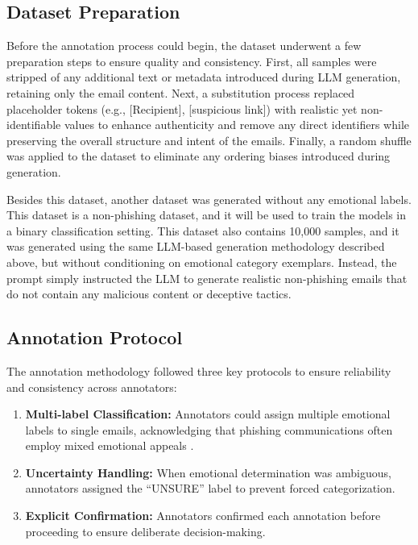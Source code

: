 \subsection{Dataset Preparation}

Before the annotation process could begin, the dataset underwent a few preparation steps to ensure quality and consistency. First, all samples were stripped of any additional text or metadata introduced during LLM generation, retaining only the email content. Next, a substitution process replaced placeholder tokens (e.g., [Recipient], [suspicious link]) with realistic yet non-identifiable values to enhance authenticity and remove any direct identifiers while preserving the overall structure and intent of the emails. Finally, a random shuffle was applied to the dataset to eliminate any ordering biases introduced during generation.

Besides this dataset, another dataset was generated without any emotional labels. This dataset is a non-phishing dataset, and it will be used to train the models in a binary classification setting. This dataset also contains 10,000 samples, and it was generated using the same LLM-based generation methodology described above, but without conditioning on emotional category exemplars. Instead, the prompt simply instructed the LLM to generate realistic non-phishing emails that do not contain any malicious content or deceptive tactics.

\subsection{Annotation Protocol}

The annotation methodology followed three key protocols to ensure reliability and consistency across annotators:

\begin{enumerate}
    \item \textbf{Multi-label Classification:} Annotators could assign multiple emotional labels to single emails, acknowledging that phishing communications often employ mixed emotional appeals \cite{cialdini2009influence}.
    
    \item \textbf{Uncertainty Handling:} When emotional determination was ambiguous, annotators assigned the ``UNSURE'' label to prevent forced categorization.
    
    \item \textbf{Explicit Confirmation:} Annotators confirmed each annotation before proceeding to ensure deliberate decision-making.
\end{enumerate}

